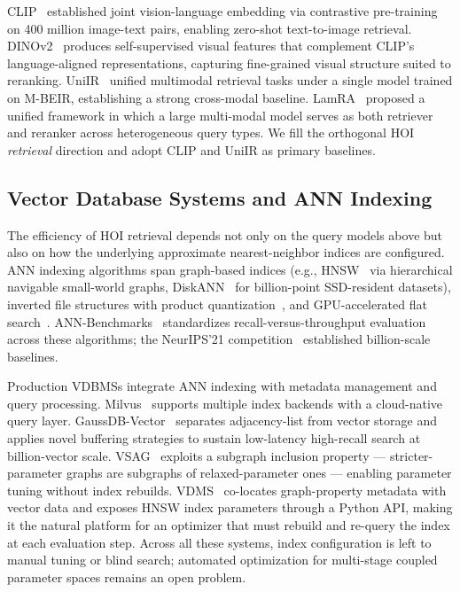 \documentclass[sigconf, nonacm]{acmart}
\theoremstyle{definition}
\begin{document}
CLIP~\cite{radford2021clip} established joint vision-language embedding via contrastive
pre-training on 400 million image-text pairs, enabling zero-shot text-to-image retrieval.
DINOv2~\cite{oquab2024dinov2} produces self-supervised visual features that complement
CLIP's language-aligned representations, capturing fine-grained visual structure suited
to reranking.
UniIR~\cite{wei2024uniir} unified multimodal retrieval tasks under a single model
trained on M-BEIR, establishing a strong cross-modal baseline.
LamRA~\cite{liu2025lamra} proposed a unified framework in which a large multi-modal
model serves as both retriever and reranker across heterogeneous query types.
We fill the orthogonal HOI \emph{retrieval} direction and adopt CLIP and UniIR as
primary baselines.

\subsection{Vector Database Systems and ANN Indexing}
The efficiency of HOI retrieval depends not only on the query models above but also on how the underlying approximate nearest-neighbor indices are configured.
ANN indexing algorithms span graph-based indices (e.g., HNSW~\cite{malkov2020hnsw} via
hierarchical navigable small-world graphs, DiskANN~\cite{subramanya2019diskann} for
billion-point SSD-resident datasets), inverted file structures with product
quantization~\cite{jegou2011pq}, and GPU-accelerated flat search~\cite{johnson2021billion}.
ANN-Benchmarks~\cite{aumuller2020ann} standardizes recall-versus-throughput evaluation
across these algorithms; the NeurIPS'21 competition~\cite{simhadri2022neurips} established
billion-scale baselines.

Production VDBMSs integrate ANN indexing with metadata management and query processing.
Milvus~\cite{wang2021milvus} supports multiple index backends with a cloud-native query
layer.
GaussDB-Vector~\cite{sun2025gaussdb} separates adjacency-list from vector storage and
applies novel buffering strategies to sustain low-latency high-recall search at billion-vector scale.
VSAG~\cite{zhong2025vsag} exploits a subgraph inclusion property --- stricter-parameter
graphs are subgraphs of relaxed-parameter ones --- enabling parameter tuning without index rebuilds.
VDMS~\cite{remis2021vdms} co-locates graph-property metadata with vector data and exposes
HNSW index parameters through a Python API, making it the natural platform for an
optimizer that must rebuild and re-query the index at each evaluation step.
Across all these systems, index configuration is left to manual tuning or blind search;
automated optimization for multi-stage coupled parameter spaces remains an open problem.
\end{document}
